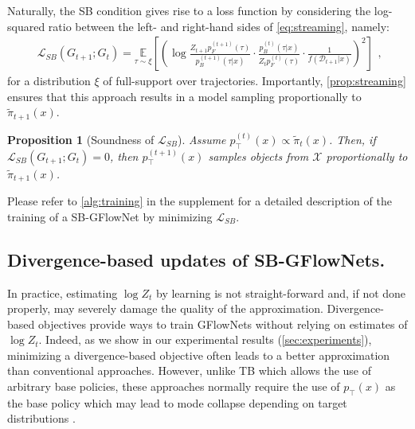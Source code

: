 \documentclass{article}
\theoremstyle{plain}
\newtheorem{proposition}{Proposition}
\theoremstyle{definition}
\theoremstyle{remark}
\theoremstyle{remark}
\begin{document}
Naturally, the SB condition gives rise to a loss function by considering the log-squared ratio between the left- and right-hand sides of \autoref{eq:streaming}, namely:
\begin{equation} \label{eq:aaa} 
    \begin{split} 
        \mathcal{L}_{SB}(G_{t+1}; G_{t}) = 
        \underset{\tau \sim \xi}{\mathbb{E}}\left[\left( \log 
        \frac{Z_{t + 1} p_{F}^{(t + 1)}(\tau)}{p_{B}^{(t + 1)}(\tau | x)} 
        \cdot 
        \frac{p_{B}^{(t)}(\tau | x)}{Z_{t} p_{F}^{(t)}(\tau)} 
        \cdot 
        \frac{1}{f(\mathcal{D}_{t + 1} | x)} 
        \right)^{2}\right]
    \end{split},
\end{equation}
for a distribution $\xi$ of full-support over trajectories. Importantly, \autoref{prop:streaming} ensures that this approach results in a model sampling proportionally to $\tilde{\pi}_{t + 1}(x)$. 

\begin{proposition}[Soundness of $\mathcal{L}_{SB}$] \label{prop:streaming} 
    Assume $p_{\top}^{(t)}(x) \propto \tilde{\pi}_{t}(x)$. Then, if $\mathcal{L}_{SB}(G_{t+1};G_t) = 0$, then $p_{\top}^{(t + 1)}(x)$ samples objects from $\mathcal{X}$ proportionally to $\tilde{\pi}_{t + 1}(x)$.
\end{proposition}

Please refer to \autoref{alg:training} in the supplement for a detailed description of the training of a SB-GFlowNet by minimizing $\mathcal{L}_{SB}$.


\subsection{Divergence-based updates of SB-GFlowNets.}
\label{subsec:skl}
In practice, estimating $\log Z_t$ by learning is not straight-forward and, if not done properly, may severely damage the quality of the approximation. Divergence-based objectives provide ways to train GFlowNets without relying on estimates of $\log Z_t$. Indeed, as we show in our experimental results (\autoref{sec:experiments}), minimizing a divergence-based objective often leads to a better approximation than conventional approaches.
% 
However, unlike TB which allows the use of arbitrary base policies, these approaches normally require the use of $p_\intercal(x)$ as the base policy which may lead to mode collapse depending on target distributions \cite{malkin2023gflownets, Broderick13}.
\end{document}

